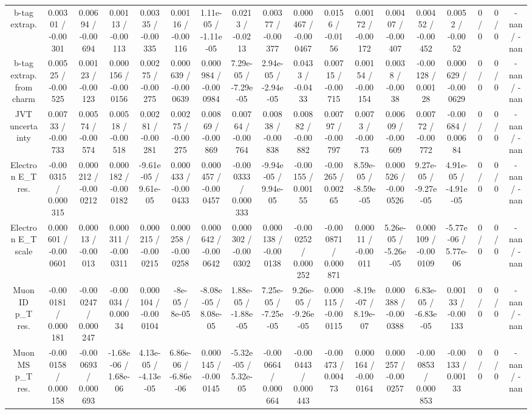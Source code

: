 \documentclass[10pt]{article}
\begin{document}
\begin{table}[htbp]
\begin{center}
\begin{tabular}{|c|c|c|c|c|c|c|c|c|c|c|c|c|c|c|c|c|c|}
  b-tag extrap. & 0.00301 / -0.00301 & 0.00694 / -0.00694 & 0.00113 / -0.00113 & 0.00335 / -0.00335 & 0.00116 / -0.00116 & 1.11e-05 / -1.11e-05 & 0.0213 / -0.0213 & 0.00377 / -0.00377 & 0.000467 / -0.000467 & 0.0156 / -0.0156 & 0.00172 / -0.00172 & 0.00407 / -0.00407 & 0.00452 / -0.00452 & 0.0052 / -0.0052 & 0 / 0 & 0 / 0 & -nan / -nan \\ 
  b-tag extrap. from charm & 0.00525 / -0.00525 & 0.00123 / -0.00123 & 0.000156 / -0.000156 & 0.00275 / -0.00275 & 0.000639 / -0.000639 & 0.000984 / -0.000984 & 7.29e-05 / -7.29e-05 & 2.94e-05 / -2.94e-05 & 0.0433 / -0.0433 & 0.00715 / -0.00715 & 0.00154 / -0.00154 & 0.0038 / -0.0038 & -0.00128 / 0.00128 & 0.000629 / -0.000629 & 0 / 0 & 0 / 0 & -nan / -nan \\ 
  JVT uncertainty & 0.00733 / -0.00733 & 0.00574 / -0.00574 & 0.00518 / -0.00518 & 0.00281 / -0.00281 & 0.00275 / -0.00275 & 0.00869 / -0.00869 & 0.00764 / -0.00764 & 0.00838 / -0.00838 & 0.00882 / -0.00882 & 0.00797 / -0.00797 & 0.0073 / -0.0073 & 0.00609 / -0.00609 & 0.00772 / -0.00772 & -0.00684 / 0.00684 & 0 / 0 & 0 / 0 & -nan / -nan \\ 
  Electron E_{T} res. & -0.000315 / 0.000315 & 0.000212 / -0.000212 & 0.000182 / -0.000182 & -9.61e-05 / 9.61e-05 & 0.000433 / -0.000433 & 0.000457 / -0.000457 & -0.000333 / 0.000333 & -9.94e-05 / 9.94e-05 & -0.00155 / 0.00155 & -0.00265 / 0.00265 & 8.59e-05 / -8.59e-05 & 0.000526 / -0.000526 & 9.27e-05 / -9.27e-05 & 4.91e-05 / -4.91e-05 & 0 / 0 & 0 / 0 & -nan / -nan \\ 
  Electron E_{T} scale & 0.000601 / -0.000601 & 0.00013 / -0.00013 & 0.000311 / -0.000311 & 0.000215 / -0.000215 & 0.000258 / -0.000258 & 0.000642 / -0.000642 & 0.000302 / -0.000302 & 0.000138 / -0.000138 & -0.000252 / 0.000252 & -0.000871 / 0.000871 & 0.00011 / -0.00011 & 5.26e-05 / -5.26e-05 & 0.000109 / -0.000109 & -5.77e-06 / 5.77e-06 & 0 / 0 & 0 / 0 & -nan / -nan \\ 
  Muon ID p_{T} res. & -0.000181 / 0.000181 & -0.000247 / 0.000247 & -0.00034 / 0.00034 & 0.000104 / -0.000104 & -8e-05 / 8e-05 & -8.08e-05 / 8.08e-05 & 1.88e-05 / -1.88e-05 & 7.25e-05 / -7.25e-05 & 9.26e-05 / -9.26e-05 & 0.000115 / -0.000115 & -8.19e-07 / 8.19e-07 & 0.000388 / -0.000388 & 6.83e-05 / -6.83e-05 & 0.00133 / -0.00133 & 0 / 0 & 0 / 0 & -nan / -nan \\ 
  Muon MS p_{T} res. & -0.000158 / 0.000158 & -0.000693 / 0.000693 & -1.68e-06 / 1.68e-06 & 4.13e-05 / -4.13e-05 & 6.86e-06 / -6.86e-06 & 0.000145 / -0.000145 & -5.32e-05 / 5.32e-05 & -0.000664 / 0.000664 & -0.000443 / 0.000443 & -0.00473 / 0.00473 & 0.000164 / -0.000164 & 0.000257 / -0.000257 & -0.000853 / 0.000853 & -0.00133 / 0.00133 & 0 / 0 & 0 / 0 & -nan / -nan \\ 

\end{tabular}
\end{center}
\end{table}
\end{document}
